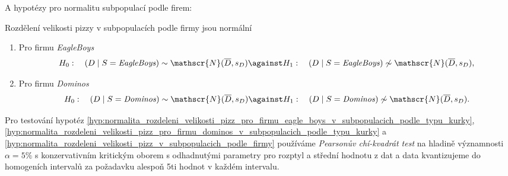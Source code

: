 A hypotézy pro normalitu subpopulací podle firem:

\begin{hypothesis}
	\label{hyp:normalita_rozdeleni_velikosti_pizz_v_subpopulacich_podle_firmy}
	Rozdělení velikosti pizzy v subpopulacích podle firmy jsou normální
	\begin{enumerate}[label=(\alph*)]
		\item Pro firmu \emph{EagleBoys}
		      \label{hyp:normalita_rozdeleni_velikosti_pizz_v_subpopulacich_podle_firmy_eb}
		      \[
			      H_0: \quad (D \mid S = \text{\emph{EagleBoys}}) \sim
			      \mathscr{N}(\overline{D}, s_D) \against H_1: \quad (D \mid S =
			      \text{\emph{EagleBoys}}) \not\sim \mathscr{N}(\overline{D},
			      s_D),
		      \]
		\item Pro firmu \emph{Dominos}
		      \label{hyp:normalita_rozdeleni_velikosti_pizz_v_subpopulacich_podle_firmy_d}
		      \[
			      H_0: \quad (D \mid S = \text{\emph{Dominos}}) \sim
			      \mathscr{N}(\overline{D}, s_D) \against H_1: \quad (D \mid S = \text{\emph{Dominos}}) \not\sim \mathscr{N}(\overline{D},
			      s_D).
		      \]
	\end{enumerate}
\end{hypothesis}

Pro testování hypotéz
\ref{hyp:normalita_rozdeleni_velikosti_pizz_pro_firmu_eagle_boys_v_subpopulacich_podle_typu_kurky},
\ref{hyp:normalita_rozdeleni_velikosti_pizz_pro_firmu_dominos_v_subpopulacich_podle_typu_kurky} a
\ref{hyp:normalita_rozdeleni_velikosti_pizz_v_subpopulacich_podle_firmy} používáme \emph{Pearsonův
	chí-kvadrát test} na hladině významnosti \(\alpha = 5 \%\) s konzervativním kritickým oborem s odhadnutými parametry pro rozptyl a
střední hodnotu z dat a data kvantizujeme do homogeních intervalů za požadavku alespoň 5ti
hodnot v každém intervalu.

